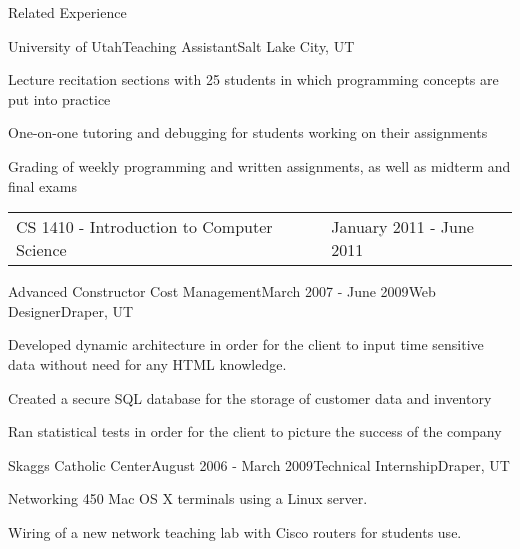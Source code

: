 \documentclass{resume}
\begin{document}
\begin{rSection}{Related Experience}

\begin{experienceTA}
\begin{rSubsection}{University of Utah}{}{Teaching Assistant}{Salt Lake City, UT}
\item Lecture recitation sections with 25 students in which programming concepts are put into practice
\item One-on-one tutoring and debugging for students working on their assignments
\item Grading of weekly programming and written assignments, as well as midterm and final exams
\\
\begin{tabularx}{\textwidth}{ X l }
CS 1410 - Introduction to Computer Science & January 2011 - June 2011
\end{tabularx}
\end{rSubsection}
\end{experienceTA}


\begin{experienceACCM}
\begin{rSubsection}{Advanced Constructor Cost Management}{March 2007 - June 2009}{Web Designer}{Draper, UT}
\item Developed dynamic architecture in order for the client to input time sensitive data without need for any HTML knowledge.
\item Created a secure SQL database for the storage of customer data and inventory
\item Ran statistical tests in order for the client to picture the success of the company
\end{rSubsection}
\end{experienceACCM}


\begin{experienceJdIntern}
\begin{rSubsection}{Skaggs Catholic Center}{August 2006 - March 2009}{Technical Internship}{Draper, UT}
\item Networking 450 Mac OS X terminals using a Linux server.
\item Wiring of a new network teaching lab with Cisco routers for students use.
\end{rSubsection}
\end{experienceJdIntern}

\end{rSection}
\end{document}
